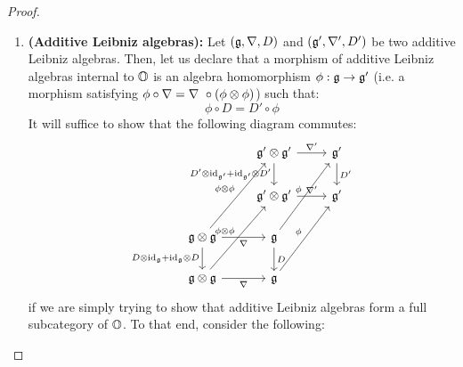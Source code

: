                         \begin{proof}
                            \noindent
                            \begin{enumerate}
                                \item \textbf{(Additive Leibniz algebras):} Let $(\mathfrak{g}, \nabla, D)$ and $(\mathfrak{g}', \nabla', D')$ be two additive Leibniz algebras. Then, let us declare that a morphism of additive Leibniz algebras internal to $\mathbb{O}$ is an algebra homomorphism $\phi: \mathfrak{g} \to \mathfrak{g}'$ (i.e. a morphism satisfying $\phi \circ \nabla = \nabla\ \circ (\phi \tensor \phi)$) such that:
                                    $$\phi \circ D = D' \circ \phi$$
                                It will suffice to show that the following diagram commutes:
                                    $$
                                        \begin{tikzcd}
                                        	& {\g' \tensor \g'} & {\g'} \\
                                        	& {\g' \tensor \g'} & {\g'} \\
                                        	{\g \tensor \g} & {\g} \\
                                        	{\g \tensor \g} & {\g}
                                        	\arrow["{\phi \tensor \phi}", from=3-1, to=1-2]
                                        	\arrow["{\phi}", from=3-2, to=1-3]
                                        	\arrow["{\phi}", from=4-2, to=2-3]
                                        	\arrow["{D'}", from=1-3, to=2-3]
                                        	\arrow["{\nabla'}", from=1-2, to=1-3]
                                        	\arrow["{D' \tensor \id_{\g'} + \id_{\g'} \tensor D'}"', from=1-2, to=2-2]
                                        	\arrow["{\nabla'}", from=2-2, to=2-3]
                                        	\arrow["{D}", from=3-2, to=4-2]
                                        	\arrow["{D \tensor \id_{\g} + \id_{\g} \tensor D}"', from=3-1, to=4-1]
                                        	\arrow["{\nabla}"', from=4-1, to=4-2]
                                        	\arrow["{\nabla}"', from=3-1, to=3-2]
                                        	\arrow["{\phi \tensor \phi}", from=4-1, to=2-2]
                                        \end{tikzcd}
                                    $$
                                if we are simply trying to show that additive Leibniz algebras form a full subcategory of $\mathbb{O}$. To that end, consider the following:

\end{enumerate}
\end{proof}
